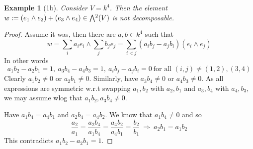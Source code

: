 \documentclass{scrartcl}
\newcommand{\extpow}{\mathchoice{{\textstyle\bigwedge}}
    {{\bigwedge}}
    {{\textstyle\wedge}}
    {{\scriptstyle\wedge}}}
\newtheorem{example}[definition]{Example}
\begin{document}
\begin{example}[1b]
    Consider $V = k^4$. 
    Then the element $w := (e_1 \wedge e_2) + (e_3 \wedge e_4) \in \extpow^2(V)$ is not decomposable. 
\end{example}
\begin{proof}
    Assume it was, then there are $a, b \in k^4$ such that
    \begin{equation*}
        w = \sum_i a_i e_i \wedge \sum_j b_j e_j = \sum_{i < j} (a_i b_j - a_j b_i) (e_i \wedge e_j)
    \end{equation*}
    In other words
    \begin{equation*}
        a_1b_2 - a_2b_1 = 1, \ a_3b_4 - a_4b_3 = 1, \ a_i b_j - a_j b_i = 0 \ \text{for all $(i, j) \neq (1, 2), (3, 4)$}
    \end{equation*}
    Clearly $a_1 b_2 \neq 0$ or $a_2 b_1 \neq 0$.
    Similarly, have $a_3 b_4 \neq 0$ or $a_4 b_3 \neq 0$.
    As all expressions are symmetric w.r.t swapping $a_1, b_2$ with $a_2, b_1$ and $a_3, b_4$ with $a_4, b_3$, we may assume wlog that $a_1 b_2, a_3 b_4 \neq 0$.

    Have $a_1 b_4 = a_4 b_1$ and $a_2 b_4 = a_4 b_2$.
    We know that $a_1 b_4 \neq 0$ and so
    \begin{equation*}
        \frac {a_2} {a_1} = \frac {a_2 b_4} {a_1 b_4} = \frac {a_4 b_2} {a_4 b_1} = \frac {b_2} {b_1} \ \Rightarrow \ a_2 b_1 = a_1 b_2
    \end{equation*}
    This contradicts $a_1 b_2 - a_2 b_1 = 1$.
\end{proof}
\end{document}
